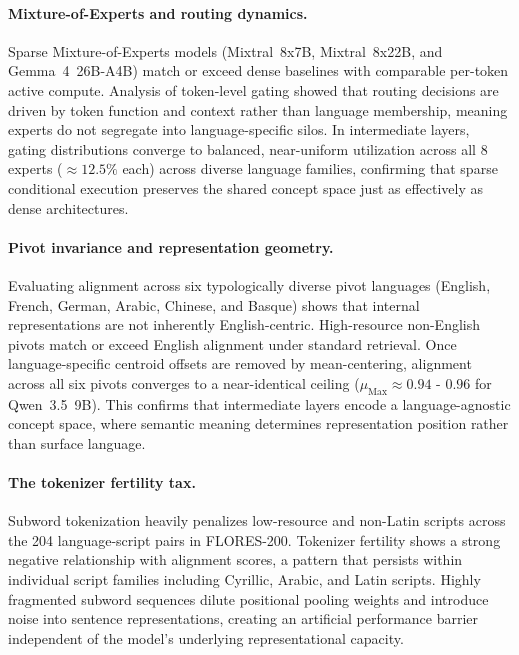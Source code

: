 \paragraph{Mixture-of-Experts and routing dynamics.}
Sparse Mixture-of-Experts models (Mixtral~8x7B, Mixtral~8x22B, and Gemma~4~26B-A4B) match or exceed dense baselines with comparable per-token active compute. Analysis of token-level gating showed that routing decisions are driven by token function and context rather than language membership, meaning experts do not segregate into language-specific silos. In intermediate layers, gating distributions converge to balanced, near-uniform utilization across all 8 experts ($\approx 12.5\%$ each) across diverse language families, confirming that sparse conditional execution preserves the shared concept space just as effectively as dense architectures.

\paragraph{Pivot invariance and representation geometry.}
Evaluating alignment across six typologically diverse pivot languages (English, French, German, Arabic, Chinese, and Basque) shows that internal representations are not inherently English-centric. High-resource non-English pivots match or exceed English alignment under standard retrieval. Once language-specific centroid offsets are removed by mean-centering, alignment across all six pivots converges to a near-identical ceiling ($\mu_{\text{Max}} \approx 0.94$ - $0.96$ for Qwen~3.5~9B). This confirms that intermediate layers encode a language-agnostic concept space, where semantic meaning determines representation position rather than surface language.

\paragraph{The tokenizer fertility tax.}
Subword tokenization heavily penalizes low-resource and non-Latin scripts across the 204 language-script pairs in FLORES-200. Tokenizer fertility shows a strong negative relationship with alignment scores, a pattern that persists within individual script families including Cyrillic, Arabic, and Latin scripts. Highly fragmented subword sequences dilute positional pooling weights and introduce noise into sentence representations, creating an artificial performance barrier independent of the model's underlying representational capacity.

